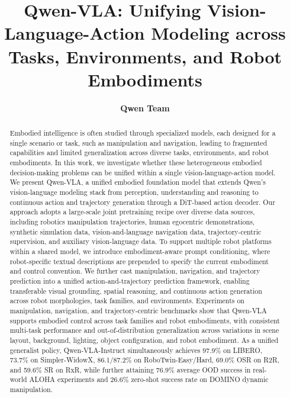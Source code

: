 \documentclass{article}
\title{Qwen-VLA: Unifying Vision-Language-Action Modeling across Tasks, Environments, and Robot Embodiments}
\author{
\bf Qwen Team}
\begin{document}
\maketitle

\begin{abstract}
Embodied intelligence is often studied through specialized models, each designed for a single scenario or task, such as manipulation and navigation, leading to fragmented capabilities and limited generalization across diverse tasks, environments, and robot embodiments. In this work, we investigate whether these heterogeneous embodied decision-making problems can be unified within a single vision-language-action model. 
%
We present Qwen-VLA, a unified embodied foundation model that extends Qwen’s vision-language modeling stack from perception, understanding and reasoning to continuous action and trajectory generation through a DiT-based action decoder. 
%
Our approach adopts a large-scale joint pretraining recipe over diverse data sources, including robotics manipulation trajectories, human egocentric demonstrations, synthetic simulation data, vision-and-language navigation data, trajectory-centric supervision, and auxiliary vision-language data.
%
To support multiple robot platforms within a shared model, we introduce embodiment-aware prompt conditioning, where robot-specific textual descriptions are prepended to specify the current embodiment and control convention. 
%
We further cast manipulation, navigation, and trajectory prediction into a unified action-and-trajectory prediction framework, enabling transferable visual grounding, spatial reasoning, and continuous action generation across robot morphologies, task families, and environments.
Experiments on manipulation, navigation, and trajectory-centric benchmarks show that Qwen-VLA supports embodied control across task families and robot embodiments, with consistent multi-task performance and out-of-distribution generalization across variations in scene layout, background, lighting, object configuration, and robot embodiment. 
As a unified generalist policy, Qwen-VLA-Instruct simultaneously achieves 97.9\% on LIBERO, 73.7\% on Simpler-WidowX, 86.1/87.2\% on RoboTwin-Easy/Hard, 69.0\% OSR on R2R, and 59.6\% SR on RxR, while further attaining 76.9\% average OOD success in real-world ALOHA experiments and 26.6\% zero-shot success rate on DOMINO dynamic manipulation.



\end{abstract}
\end{document}
